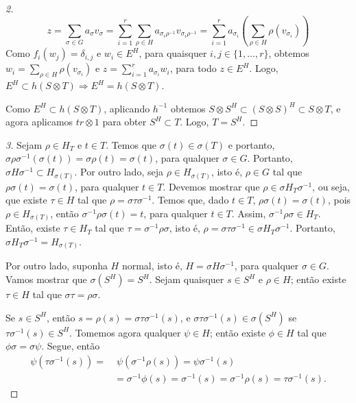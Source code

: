 \begin{teo}
\begin{proof}[2]
\[z= \sum_{\sigma \in G} a_\sigma v_\sigma = \sum_{i=1}^{r}\sum_{\rho \in H} a_{\sigma_i\rho^{-1}}v_{\sigma_i\rho^{-1}} = \sum_{i=1}^{r} a_{\sigma_i} \left( \sum_{\rho \in H}\rho(v_{\sigma_i}) \right)\]
Como $f_i(w_j)=\delta_{i,j}$ e $w_i \in E^H$, para quaisquer $i,j \in \{ 1, \dots, r\}$, obtemos $w_i = \sum_{\rho \in H} \rho(v_{\sigma_i})$ e $z=\sum_{i=1}^{r}a_{\sigma_i}w_i$, para todo $z \in E^H$. Logo, $E^H \subset h(S\otimes T) \Rightarrow E^H = h(S\otimes T)$. \par
Como $E^H \subset h(S\otimes T)$, aplicando $h^{-1}$ obtemos $S\otimes S^H \subset (S\otimes S)^H \subset S\otimes T$, e agora aplicamos $tr \otimes 1$ para obter $S^H \subset T$. Logo, $T=S^H$.
\end{proof}

\begin{proof}[3]
Sejam $\rho \in H_T$ e $t \in T$. Temos que $\sigma(t) \in \sigma (T)$ e portanto, $\sigma \rho \sigma^{-1}(\sigma(t)) = \sigma\rho(t)=\sigma(t)$, para qualquer $\sigma \in G$. Portanto, $\sigma H \sigma^{-1} \subset H_{\sigma(T)} $. Por outro lado, seja $\rho \in H_{\sigma(T)}$, isto é, $\rho \in G$ tal que $\rho \sigma(t)=\sigma(t)$, para qualquer $t \in T$. Devemos mostrar que  $\rho \in \sigma H_T\sigma^{-1}$, ou seja, que existe $\tau \in H$ tal que $\rho = \sigma \tau \sigma^{-1}$. Temos que, dado $t \in T$, $ \rho \sigma (t) = \sigma(t)$, pois $\rho \in H_{\sigma(T)}$, então $\sigma^{-1}\rho \sigma (t) = t$, para qualquer $t \in T$. Assim, $\sigma^{-1}\rho \sigma \in H_T$. Então, existe $\tau \in H_T$ tal que $\tau = \sigma^{-1} \rho \sigma$, isto é, $\rho = \sigma \tau \sigma^{-1} \in \sigma H_T \sigma^{-1}$. Portanto, $\sigma H_T \sigma^{-1}= H_{\sigma(T)}$.\par 
Por outro lado, suponha $H$ normal, isto é, $H=\sigma H \sigma^{-1}$, para qualquer $\sigma \in G$. Vamos mostrar que $\sigma(S^H) = S^H$. Sejam quaisquer $s \in S^H$ e $\rho \in H$; então existe $\tau \in H$  tal que $\sigma\tau = \rho\sigma$. \par
Se $s \in S^H$, então $s = \rho (s) = \sigma\tau\sigma^{-1}(s)$, e $\sigma\tau\sigma^{-1}(s) \in \sigma(S^H)$ se $\tau\sigma^{-1}(s) \in S^H$. Tomemos agora qualquer $\psi\in H$; então existe $\phi \in H$ tal que $\phi\sigma = \sigma \psi $. Segue, então
\begin{align*}
\psi( \tau \sigma^{-1}(s)) =& \; \psi( \sigma^{-1} \rho(s)) = \psi\sigma^{-1}(s) \\
&= \sigma^{-1}\phi(s) = \sigma^{-1}(s) = \sigma^{-1}\rho(s) = \tau\sigma^{-1}(s).
\end{align*}

\end{proof}
\end{teo}
